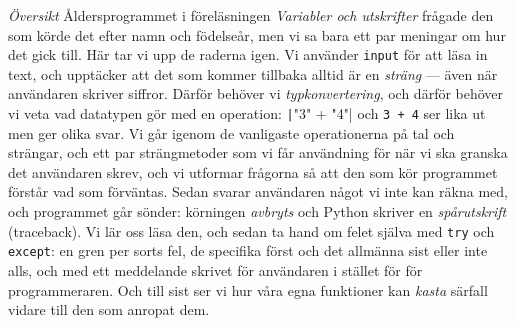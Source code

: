 \emph{Översikt}
Åldersprogrammet i föreläsningen \emph{Variabler och utskrifter} frågade
den som körde det efter namn och födelseår, men vi sa bara ett par
meningar om hur det gick till.  Här tar vi upp de raderna igen.  Vi
använder \texttt{input} för att läsa in text, och upptäcker
att det som kommer tillbaka alltid är en \emph{sträng} --- även när
användaren skriver siffror.  Därför behöver vi \emph{typkonvertering},
och därför behöver vi veta vad datatypen gör med en operation:
\texttt|"3" + "4"| och \texttt{3 + 4} ser lika
ut men ger olika svar.  Vi går igenom de vanligaste operationerna på tal
och strängar, och ett par strängmetoder som vi får användning för när vi
ska granska det användaren skrev, och vi utformar frågorna så att den
som kör programmet förstår vad som förväntas.  Sedan svarar användaren
något vi inte kan räkna med, och programmet går sönder: körningen
\emph{avbryts} och Python skriver en \emph{spårutskrift}
(\foreignlanguage{english}{traceback}).  Vi lär oss läsa den, och sedan
ta hand om felet själva med \texttt{try} och
\texttt{except}: en gren per sorts fel, de specifika först
och det allmänna sist eller inte alls, och med ett meddelande skrivet
för användaren i stället för för programmeraren.  Och till sist ser vi
hur våra egna funktioner kan \emph{kasta} särfall vidare till den som
anropat dem.

